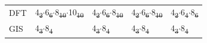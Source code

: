 \documentclass[preprint,numrefs,noinfo,sort&compress]{elsarticle}
\providecommand{\DIFadd}[1]{{\protect\color{blue}\uwave{#1}}} %
\providecommand{\DIFdel}[1]{{\protect\color{red}\sout{#1}}}                      %
\providecommand{\DIFaddFL}[1]{\DIFadd{#1}} %
\providecommand{\DIFdelFL}[1]{\DIFdel{#1}} %
\providecommand{\DIFaddbeginFL}{} %
\providecommand{\DIFaddendFL}{} %
\providecommand{\DIFdelbeginFL}{} %
\providecommand{\DIFdelendFL}{} %
\newcommand{\DIFscaledelfig}{0.5}
\newlength{\DIFdelgraphicswidth} %
\newlength{\DIFdelgraphicsheight} %
\newcommand{\DIFaddincludegraphics}[2][]{{\color{blue}\fbox{\DIFOincludegraphics[#1]{#2}}}} %
\newcommand{\DIFdelincludegraphics}[2][]{%
\sbox{\DIFdelgraphicsbox}{\DIFOincludegraphics[#1]{#2}}%
\settoboxwidth{\DIFdelgraphicswidth}{\DIFdelgraphicsbox} %
\settoboxtotalheight{\DIFdelgraphicsheight}{\DIFdelgraphicsbox} %
\scalebox{\DIFscaledelfig}{%
\parbox[b]{\DIFdelgraphicswidth}{\usebox{\DIFdelgraphicsbox}\\[-\baselineskip] \rule{\DIFdelgraphicswidth}{0em}}\llap{\resizebox{\DIFdelgraphicswidth}{\DIFdelgraphicsheight}{%
\setlength{\unitlength}{\DIFdelgraphicswidth}%
\begin{picture}(1,1)%
\thicklines\linethickness{2pt} %
{\color[rgb]{1,0,0}\put(0,0){\framebox(1,1){}}}%
{\color[rgb]{1,0,0}\put(0,0){\line( 1,1){1}}}%
{\color[rgb]{1,0,0}\put(0,1){\line(1,-1){1}}}%
\end{picture}%
}\hspace*{3pt}}} %
} %
\DeclareRobustCommand{\DIFaddbeginFL}{\DIFOaddbeginFL \let\includegraphics\DIFaddincludegraphics} %
\DeclareRobustCommand{\DIFaddendFL}{\DIFOaddendFL \let\includegraphics\DIFOincludegraphics} %
\DeclareRobustCommand{\DIFdelbeginFL}{\DIFOdelbeginFL \let\includegraphics\DIFdelincludegraphics} %
\DeclareRobustCommand{\DIFdelendFL}{\DIFOaddendFL \let\includegraphics\DIFOincludegraphics} %
\begin{document}
\begin{table}
\begin{threeparttable}
{\begin{tabular}{lllll}
DFT & 4\DIFdelbeginFL \DIFdelFL{\textsubscript{2}\(\cdot\)}\DIFdelendFL \DIFaddbeginFL \DIFaddFL{\(_{\text{2}} \cdot\)}\DIFaddendFL 6\DIFdelbeginFL \DIFdelFL{\textsubscript{6}\(\cdot\)}\DIFdelendFL \DIFaddbeginFL \DIFaddFL{\(_{\text{6}} \cdot\)}\DIFaddendFL 8\DIFdelbeginFL \DIFdelFL{\textsubscript{10}\(\cdot\)}\DIFdelendFL \DIFaddbeginFL \DIFaddFL{\(_{\text{10}} \cdot\)}\DIFaddendFL 10\DIFdelbeginFL \DIFdelFL{\textsubscript{10} }\DIFdelendFL \DIFaddbeginFL \DIFaddFL{\(_{\text{10}}\) }\DIFaddendFL & 4\DIFdelbeginFL \DIFdelFL{\textsubscript{2}\(\cdot\)}\DIFdelendFL \DIFaddbeginFL \DIFaddFL{\(_{\text{2}} \cdot\)}\DIFaddendFL 6\DIFdelbeginFL \DIFdelFL{\textsubscript{6}\(\cdot\)}\DIFdelendFL \DIFaddbeginFL \DIFaddFL{\(_{\text{6}} \cdot\)}\DIFaddendFL 8\DIFdelbeginFL \DIFdelFL{\textsubscript{10} }\DIFdelendFL \DIFaddbeginFL \DIFaddFL{\(_{\text{10}}\) }\DIFaddendFL & 4\DIFdelbeginFL \DIFdelFL{\textsubscript{2}\(\cdot\)}\DIFdelendFL \DIFaddbeginFL \DIFaddFL{\(_{\text{2}} \cdot\)}\DIFaddendFL 6\DIFdelbeginFL \DIFdelFL{\textsubscript{6}\(\cdot\)}\DIFdelendFL \DIFaddbeginFL \DIFaddFL{\(_{\text{6}} \cdot\)}\DIFaddendFL 8\DIFdelbeginFL \DIFdelFL{\textsubscript{10} }\DIFdelendFL \DIFaddbeginFL \DIFaddFL{\(_{\text{10}}\) }\DIFaddendFL & 4\DIFdelbeginFL \DIFdelFL{\textsubscript{2}\(\cdot\)}\DIFdelendFL \DIFaddbeginFL \DIFaddFL{\(_{\text{2}} \cdot\)}\DIFaddendFL 6\DIFdelbeginFL \DIFdelFL{\textsubscript{4}\(\cdot\)}\DIFdelendFL \DIFaddbeginFL \DIFaddFL{\(_{\text{4}} \cdot\)}\DIFaddendFL 8\DIFdelbeginFL \DIFdelFL{\textsubscript{6}}\DIFdelendFL \DIFaddbeginFL \DIFaddFL{\(_{\text{6}}\)}\DIFaddendFL \\
GIS & 4\DIFdelbeginFL \DIFdelFL{\textsubscript{3}\(\cdot\)}\DIFdelendFL \DIFaddbeginFL \DIFaddFL{\(_{\text{3}} \cdot\)}\DIFaddendFL 8\DIFdelbeginFL \DIFdelFL{\textsubscript{4} }\DIFdelendFL \DIFaddbeginFL \DIFaddFL{\(_{\text{4}}\) }\DIFaddendFL & 4\DIFdelbeginFL \DIFdelFL{\textsubscript{3}\(\cdot\)}\DIFdelendFL \DIFaddbeginFL \DIFaddFL{\(_{\text{3}} \cdot\)}\DIFaddendFL 8\DIFdelbeginFL \DIFdelFL{\textsubscript{4} }\DIFdelendFL \DIFaddbeginFL \DIFaddFL{\(_{\text{4}}\) }\DIFaddendFL & 4\DIFdelbeginFL \DIFdelFL{\textsubscript{3}\(\cdot\)}\DIFdelendFL \DIFaddbeginFL \DIFaddFL{\(_{\text{3}} \cdot\)}\DIFaddendFL 8\DIFdelbeginFL \DIFdelFL{\textsubscript{4} }\DIFdelendFL \DIFaddbeginFL \DIFaddFL{\(_{\text{4}}\) }\DIFaddendFL & 4\DIFdelbeginFL \DIFdelFL{\textsubscript{3}\(\cdot\)}\DIFdelendFL \DIFaddbeginFL \DIFaddFL{\(_{\text{3}} \cdot\)}\DIFaddendFL 8\DIFdelbeginFL \DIFdelFL{\textsubscript{4}}\DIFdelendFL \DIFaddbeginFL \DIFaddFL{\(_{\text{4}}\)}\DIFaddendFL \\

\end{tabular}}
\end{threeparttable}
\end{table}
\end{document}
